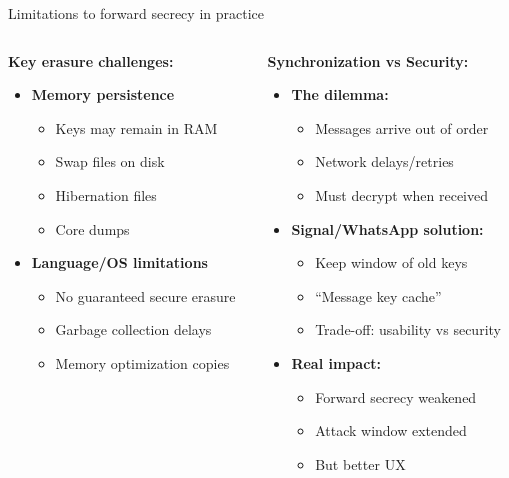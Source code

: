 \documentclass[aspectratio=169, lualatex, handout]{beamer}
\begin{document}
\begin{frame}{Limitations to forward secrecy in practice}
	\begin{columns}[c]
		\begin{column}{0.5\textwidth}
			\textbf{Key erasure challenges:}
			\begin{itemize}
				\item \textbf{Memory persistence}
				      \begin{itemize}
					      \item Keys may remain in RAM
					      \item Swap files on disk
					      \item Hibernation files
					      \item Core dumps
				      \end{itemize}
				\item \textbf{Language/OS limitations}
				      \begin{itemize}
					      \item No guaranteed secure erasure
					      \item Garbage collection delays
					      \item Memory optimization copies
				      \end{itemize}
			\end{itemize}
		\end{column}
		\begin{column}{0.5\textwidth}
			\textbf{Synchronization vs Security:}
			\begin{itemize}
				\item \textbf{The dilemma:}
				      \begin{itemize}
					      \item Messages arrive out of order
					      \item Network delays/retries
					      \item Must decrypt when received
				      \end{itemize}
				\item \textbf{Signal/WhatsApp solution:}
				      \begin{itemize}
					      \item Keep window of old keys
					      \item ``Message key cache''
					      \item Trade-off: usability vs security
				      \end{itemize}
				\item \textbf{Real impact:}
				      \begin{itemize}
					      \item Forward secrecy weakened
					      \item Attack window extended
					      \item But better UX
				      \end{itemize}
			\end{itemize}
		\end{column}
	\end{columns}
\end{frame}
\end{document}
